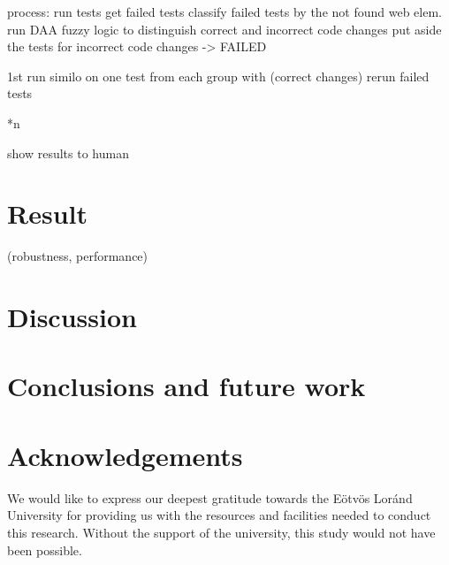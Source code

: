 \documentclass{article}
\begin{document}
process:
run tests
get failed tests
classify failed tests by the not found web elem.
run DAA fuzzy logic to distinguish correct and incorrect code changes 
put aside the tests for incorrect code changes -> FAILED  

1st run similo on one test from each group with (correct changes)
rerun failed tests

*n

show results to human



\maketitle

\section{Result}

(robustness, performance)

\maketitle

\section{Discussion}


\maketitle

\section{Conclusions and future work}


\maketitle

\section{Acknowledgements}

We would like to express our deepest gratitude towards the Eötvös Loránd University for providing us with the resources and facilities needed to conduct this research. Without the support of the university, this study would not have been possible.
\end{document}
